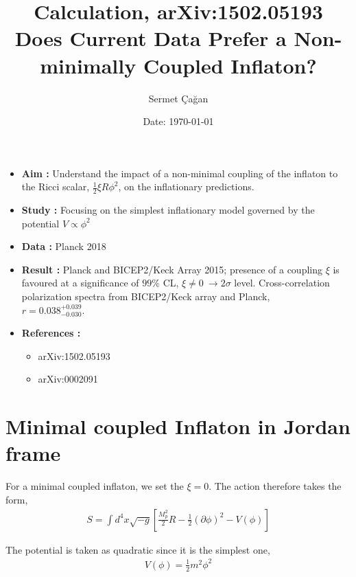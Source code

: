 

\title{\textbf{Calculation, arXiv:1502.05193\\Does Current Data Prefer a Non-minimally Coupled Inflaton?}}
\author{Sermet \c{C}a\u{g}an}
\date{Date: \today}



\maketitle
\vspace{2cm}
\begin{itemize}
\item \textbf{Aim :} Understand the impact of a non-minimal coupling of the inflaton to the Ricci scalar, $\frac{1}{2}\xi R\phi^{2}$, on the inflationary predictions.
\item \textbf{Study :} Focusing on the simplest inflationary model governed by the potential $V \propto \phi^{2}$
\item \textbf{Data :} Planck 2018
\item \textbf{Result :} Planck and BICEP2/Keck Array 2015; presence of a coupling $\xi$ is favoured at a significance of $99\%$ CL, $\xi \ne 0 \ \rightarrow 2\sigma$ level. Cross-correlation polarization spectra from BICEP2/Keck array and Planck,\\ $r = 0.038 ^{+0.039} _{-0.030}$.
\item \textbf{References :} \begin{itemize} \item arXiv:1502.05193 \item arXiv:0002091 \end{itemize}
\end{itemize}
\newpage

\section{Minimal coupled Inflaton in Jordan frame}

For a minimal coupled inflaton, we set the $\xi = 0$. The action therefore takes the form,
\begin{align}
S = \int d^{4}x \sqrt{-g}\left[\frac{M_{p}^{2}}{2}R - \frac{1}{2}\left(\partial\phi\right)^{2} - V\left(\phi\right)\right]
\end{align}

The potential is taken as quadratic since it is the simplest one,
\begin{align}
V\left(\phi\right) = \frac{1}{2}m^{2}\phi^{2}
\end{align}

